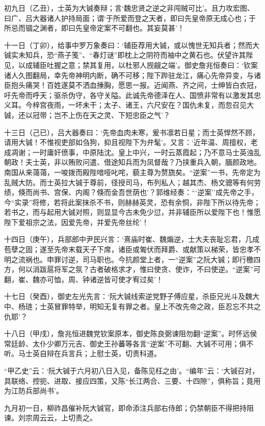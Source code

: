 \documentclass[]{article}
\begin{document}
初九日（乙丑），士英为大铖奏辩；言`魏忠贤之逆之非闯贼可比'。且力攻宏图、曰广、吕大器诸人护持局面；谓`于所爱而登之天者，即曰先皇帝原无成心也；于所忌而锢之渊者，即曰先皇帝定案不可翻也。其妄莫甚'！

十一日（丁卯），给事中罗万象奏曰：`辅臣荐用大铖，或以愧世无知兵者；然而大铖实未知兵，恐``燕子笺''、``春灯谜''即枕上之阴符而袖中之黄石也。伏望许其陛见，以成辅臣吐握之意；禁其复用，以杜邪人觊觎之端'。御史詹兆恒奏曰：`钦案诸人久图翻局，幸先帝神明内断，确不可移；陛下跸驻龙江，痛心先帝异变，与诸臣抱头痛哭！百姓遂莫不洒血捶胸，愿思一报。近闻燕、齐之间，士绅皆白衣冠，吁先帝而呼天；驱杀伪守，各守关隘。此诚先帝德泽在人、国愤非常有以激发其忠义耳。今梓宫夜雨，一坏未干；太子、诸王，六尺安在？国仇未复，而忽召见大铖，还以冠带；岂不上伤在天之灵、下短忠臣之气'？

十三日（己已），吕大器奏曰：`先帝血肉未寒，爰书凛若日星；而士英悍然不顾，请用大铖！不惟视吏部如刍狗，抑且视陛下为弁髦'。又言：`近年温、周擅权，老成凋谢；一时庸奸偾事，中原陆沈。皇上中兴，一时云蒸霞起；乃不意马士英浊乱朝政！夫士英，非以贿败问遣、借途知兵而为凤督哉？乃挟重兵入朝，腼颜政地。南国从来蔼蔼，一唆拨而殿陛喑哑叱咤，藐主尊为赘旒矣。``逆案''一书，先帝定为乱贼大防。而士英拉大铖于尊前，径授司马，布列私人；越其杰、杨文骢等有何劳绩，倏而尚书、宫保、内阁？倏而金吾世荫也'？郭维经奏：```逆案''成先帝之手，今``实录''将修，若将此案抹杀不书，则赫赫英灵，恐有余恫，非陛下所以待先帝；若书之，而与起用大铖对照，则显显今古未免少愆，并非辅臣所以爱陛下也！惟愿陛下爱祖宗之法，因爱先帝，并爱先帝丝纶'！

十四日（庚午），兵部郎中尹民兴言：`熹庙时崔、魏煽逆，士大夫丧耻忘君，几成苞孽之固；遂至先帝末载天子下席，诸臣或匍伏而拜爵、或献策以梯荣，皆忠孝不明之流祸也。申罪讨逆，司马职也。今抗颜堂上者，一``逆案''之阮大铖；即行檄四方，何以消跋扈将军之氛？古者破格求才，惟曰使贪、使诈，不曰使逆。``逆案''可翻，崔、魏亦可恤，周、钟诸逆皆可使才宥过矣'！

十七日（癸酉），御史左光先言：`阮大铖线索逆党野子傅应星，杀臣兄光斗及魏大中、杨琏；士英冒罪特举，明知无复有罪之者。皇上不改先帝之政，臣忍忘不共之仇耶'？

十八日（甲戌），詹兆恒进魏党钦案原本，御史陈良弼谏阻勿翻``逆案''。时怀远侯常廷龄、太仆少卿万元吉、御史王孙蕃等各言``逆案''不可翻、大铖不可用；俱不听。马士英自辩在兵言兵；上慰士英，切责科道。

``甲乙史''云：`阮大铖于六月初八日入见，备陈见枉之由'。``编年''云：`大铖召对，具联络、控扼、进取、接应四策，又陈``长江两合、三要、十四隙''，俱称旨；竟用为江防兵部尚书'。

九月初一日，柳祚昌催补阮大铖官，即命添注兵部右侍郎；仍禁朝臣不得把持阻谏。刘宗周云云，上切责之。
\end{document}
